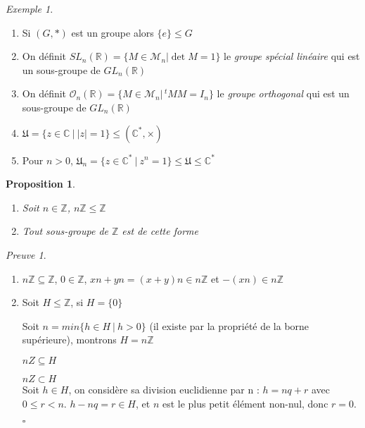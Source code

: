 \documentclass[]{article}
\newtheorem{myproposition}{Proposition}
\theoremstyle{remark}
\newtheorem{myproof}{Preuve}
\newtheorem{myexmpl}{Exemple}
\theoremstyle{definition}
\newcommand{\cqfd}{
	\hfill$\square$
}
\newenvironment{proofpart}[1]{
	{\boldmath #1}
}{
	\checkmark
}
\begin{document}
\begin{myexmpl}
	\begin{enumerate}
		\item Si $(G, *)$ est un groupe alors $\{e\} \leqslant G$
		\item On définit $SL_n(\mathbb{R})=\{M \in \mathcal{M}_n | \det M = 1\}$ le \textit{groupe spécial linéaire} qui est un sous-groupe de $GL_n(\mathbb{R})$
		\item On définit $\mathcal{O}_n(\mathbb{R})=\{M \in \mathcal{M}_n | \,^tMM = I_n\}$ le \textit{groupe orthogonal} qui est un sous-groupe de $GL_n(\mathbb{R})$
		\item $\mathfrak{U} = \{z \in \mathbb{C} ~ | ~ |z| = 1\} \leqslant (\mathbb{C}^*, \times)$
		\item Pour $n > 0$, $\mathfrak{U}_n = \{z \in \mathbb{C}^* ~ | ~ z^n = 1\} \leqslant \mathfrak{U} \leqslant \mathbb{C}^*$
	\end{enumerate}
\end{myexmpl}

\begin{myproposition}
	\leavevmode
	\begin{enumerate}
		\item Soit $n \in \mathbb{Z}$, $n\mathbb{Z} \leqslant \mathbb{Z}$
		\item Tout sous-groupe de $\mathbb{Z}$ est de cette forme
	\end{enumerate}
\end{myproposition}

\begin{myproof}
	\leavevmode
	\begin{enumerate}
		\item $n\mathbb{Z} \subseteq \mathbb{Z}$, $0 \in \mathbb{Z}$, $xn + yn = (x+y)n \in n\mathbb{Z}$ et $-(xn) \in n\mathbb{Z}$
		\item Soit $H \leqslant \mathbb{Z}$, si $H = \{0\}$ \checkmark
		
		Soit $n = min\{h \in H ~|~ h > 0\}$ (il existe par la propriété de la borne supérieure), montrons $H = n\mathbb{Z}$

		\begin{proofpart}{$nZ \subseteq H$}
		\end{proofpart}

		\begin{proofpart}{$nZ \subset H$}\\			
			Soit $h \in H$, on considère sa division euclidienne par n : $h = nq + r$ avec $0 \leqslant r < n$.
			$h - nq = r\in H$, et $n$ est le plus petit élément non-nul, donc $r = 0$.
		\end{proofpart}
		
		\cqfd
	\end{enumerate}
\end{myproof}
\end{document}
